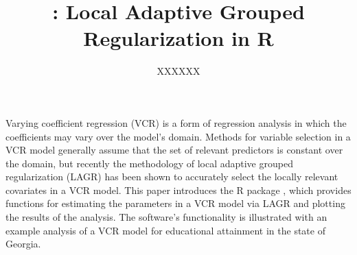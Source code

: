 \title{: Local Adaptive Grouped Regularization in R}
\author{XXXXXX}
\maketitle

Varying coefficient regression (VCR) is a form of regression analysis in which the coefficients may vary over the model's domain. Methods for variable selection in a VCR model generally assume that the set of relevant predictors is constant over the domain, but recently the methodology of local adaptive grouped regularization (LAGR) has been shown to accurately select the locally relevant covariates in a VCR model. This paper introduces the R package , which provides functions for estimating the parameters in a VCR model via LAGR and plotting the results of the analysis. The software's functionality is illustrated with an example analysis of a VCR model for educational attainment in the state of Georgia.



